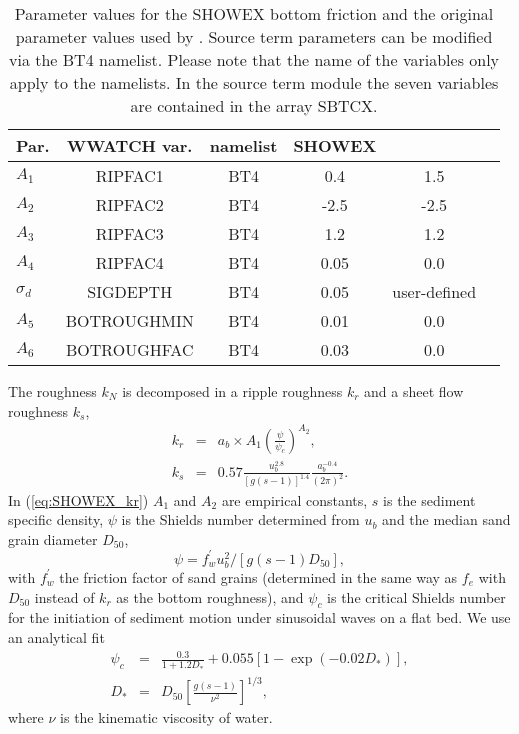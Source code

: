 \begin{table} \begin{center}
\begin{tabular}{|l|c|c|c|c|c|} \hline \hline
Par.         &  WWATCH var.           & namelist &  SHOWEX  &  \cite{tol:JPO94} \\
\hline
  $A_1$ &  RIPFAC1                    & BT4 & 0.4     & 1.5    \\
  $A_2$ &  RIPFAC2                    & BT4 & -2.5    & -2.5   \\
  $A_3$ &  RIPFAC3                    & BT4 & 1.2     & 1.2     \\
  $A_4$ &  RIPFAC4                    & BT4 & 0.05    & 0.0     \\
  $\sigma_d$ &  SIGDEPTH              & BT4 & 0.05    & user-defined  \\
  $A_5$ &  BOTROUGHMIN                & BT4 & 0.01    & 0.0     \\
  $A_6$ &  BOTROUGHFAC                & BT4 & 0.03    & 0.0     \\
\hline
\end{tabular} \end{center}
\caption{Parameter values for the SHOWEX bottom friction and the original 
  parameter values used by \cite{tol:JPO94}. Source term
  parameters can be modified via the BT4 namelist. Please
  note that the name of the variables only apply to the namelists. In the source
  term module the seven variables are contained in the array SBTCX. } \label{tab:BT4}
\botline
\end{table}

The roughness $k_{N}$ is decomposed in a ripple roughness $k_{r}$ and
a sheet flow roughness $k_{s}$,
\begin{eqnarray}
k_{r} &=&a_{b}\times A_{1}\left( \frac{\psi }{\psi _{c}}\right) ^{A_{2}}, \label{eq:SHOWEX_kr}\\
k_{s} &=&0.57\frac{u_{b}^{2.8}}{\left[ g\left( s-1\right) \right] ^{1.4}}%
\frac{a_{b}^{-0.4}}{\left( 2\pi \right) ^{2}}.
\end{eqnarray}
In (\ref{eq:SHOWEX_kr}) $A_1$ and $A_2$ are empirical constants, $s$ is the
sediment specific density, $\psi$ is the Shields number determined from $u_b$
and the median sand grain diameter $D_{50}$,
\begin{equation}
\psi =f_{w}^{\prime }u_{b}^{2}/\left[g\left( s-1\right) D_{50}\right],
\end{equation}
with $f_{w}^{\prime }$ the friction factor of sand grains (determined in the
same way as $f_e$ with $D_{50}$ instead of $k_r$ as the bottom roughness), and
$\psi _{c}$ is the critical Shields number for the initiation of sediment
motion under sinusoidal waves on a flat bed.  We use an analytical fit
\citep{bk:Soul97}
\begin{eqnarray}
\psi _{c} &=&\frac{0.3}{1+1.2D_{*}}+0.055\left[ 1-\exp \left(
-0.02D_{*}\right) \right]\label{Soulsby_psic} , \\
D_{*} &=&D_{50}\left[ \frac{g\left( s-1\right) }{\nu ^{2}}\right] ^{1/3},
\end{eqnarray}
where $\nu $ is the kinematic viscosity of water. 

